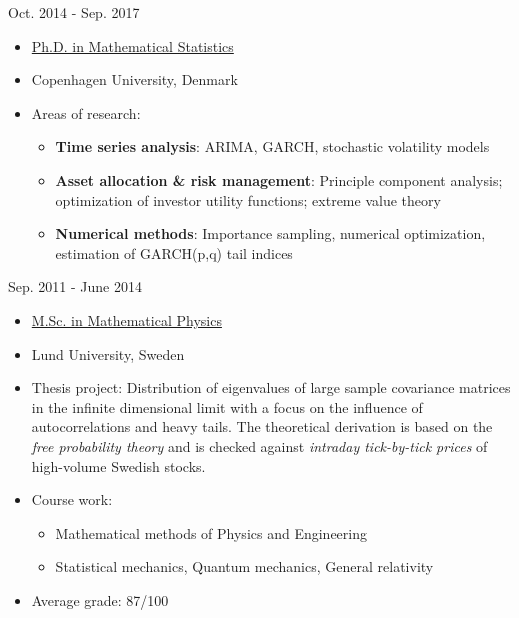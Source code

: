 \documentclass[a4paper]{twentysecondcv} %
\begin{document}
\begin{minipage}{0.15\linewidth}
  Oct. 2014 - Sep. 2017
\end{minipage} \hfill
\begin{minipage}{0.85\linewidth}
  {\small
  \begin{itemize}
  \item \underline{Ph.D. in Mathematical Statistics}
  \item Copenhagen University, Denmark
  \item Areas of research:
    \begin{itemize}
      \item {\bf Time series analysis}: ARIMA, GARCH, stochastic volatility
        models
      \item {\bf Asset allocation \& risk management}: Principle component
        analysis; optimization of investor utility functions; extreme
        value theory
      \item {\bf Numerical methods}: Importance sampling, numerical
        optimization, estimation of GARCH(p,q) tail indices
    \end{itemize}
  \end{itemize}
  }
\end{minipage}

\vspace{2mm}

\begin{minipage}{0.15\linewidth}
  Sep. 2011 - June 2014
\end{minipage} \hfill
\begin{minipage}{0.85\linewidth}
  {\small
  \begin{itemize}
  \item \underline{M.Sc. in Mathematical Physics}
  \item Lund University, Sweden
  \item Thesis project: Distribution of eigenvalues of large
    sample covariance matrices in the infinite dimensional limit with
    a focus on the influence of autocorrelations and heavy tails. The
    theoretical derivation is based on the {\it free probability
      theory} and is checked against {\it intraday tick-by-tick
      prices} of high-volume Swedish stocks.
  \item Course work:    
    \begin{itemize}
      \item Mathematical methods of Physics and Engineering
      \item Statistical mechanics, Quantum mechanics, General
        relativity
    \end{itemize}
  \item Average grade: 87/100
  \end{itemize}
  }
\end{minipage}
\vspace{2mm}
\end{document}
